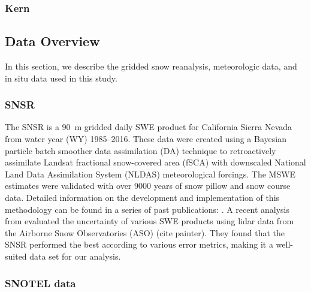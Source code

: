 \hypertarget{ch2-sa-3}{\subsubsection{Kern}\label{ch2-sa-3}}


\hypertarget{ch2-do-1}{\subsection{Data Overview}\label{ch2-do-1}}

In this section, we describe the gridded snow reanalysis, meteorologic data, and in situ data used in this study.

\hypertarget{ch2-do-2}{\subsubsection{SNSR}\label{ch2-do-2}}


The SNSR \citep{margulisLandsatEraSierraNevada2016} is a 90~m gridded daily SWE product for California Sierra Nevada from water year (WY) 1985--2016. These data were created using a Bayesian particle batch smoother data assimilation (DA) technique to retroactively assimilate Landsat fractional snow-covered area (fSCA) with downscaled National Land Data Assimilation System (NLDAS) meteorological forcings. The MSWE estimates were validated with over 9000 years of snow pillow and snow course data. Detailed information on the development and implementation of this methodology can be found in a series of past publications: \cite{durandBayesianApproachSnow2008, girottoExaminingSpatialTemporal2014, girottoProbabilisticSWEReanalysis2014, margulisParticleBatchSmoother2015}. A recent analysis from \citep{yangIntercomparisonSnowWater2023} evaluated the uncertainty of various SWE products using lidar data from the Airborne Snow Observatories (ASO) (cite painter). They found that the SNSR performed the best according to various error metrics, making it a well-suited data set for our analysis.

\hypertarget{ch2-do-2}{\subsubsection{SNOTEL data}\label{ch2-do-2}}

